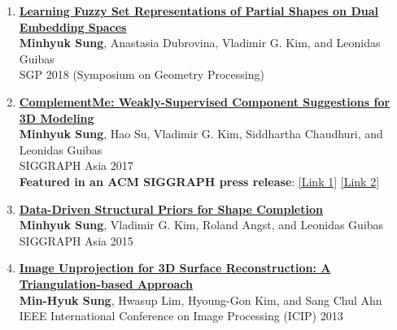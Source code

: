 \documentclass[letterpaper,10pt]{article} %
\newcommand{\blankline}{\quad\pagebreak[2]}
\begin{document}
{\begin{enumerate}
\item \label{sgp18}
\href{https://mhsung.github.io/fuzzy-set-dual}{\textbf{Learning Fuzzy Set Representations of Partial Shapes on Dual Embedding Spaces}}\\
\textbf{Minhyuk Sung}, Anastasia Dubrovina, Vladimir G. Kim, and Leonidas Guibas\\
SGP 2018 (Symposium on Geometry Processing)\\
\blankline

\item \label{siggraphasia17}
\href{https://mhsung.github.io/complement-me.html}{\textbf{ComplementMe: Weakly-Supervised Component Suggestions for 3D Modeling}}\\
\textbf{Minhyuk Sung}, Hao Su, Vladimir G. Kim, Siddhartha Chaudhuri, and Leonidas Guibas\\
SIGGRAPH Asia 2017\\
{\color{linkcolor}
\textbf{Featured in an ACM SIGGRAPH press release}:
\href{https://www.eurekalert.org/pub_releases/2017-11/afcm-sad120417.php}{[Link 1]}
\href{https://scienmag.com/simplifying-assembly-based-design-for-3-d-modeling/}{[Link 2]}
}\\
\blankline

\item \label{siggraphasia15}
\href{https://mhsung.github.io/structure-completion.html}{\textbf{Data-Driven Structural Priors for Shape Completion}}\\
\textbf{Minhyuk Sung}, Vladimir G. Kim, Roland Angst, and Leonidas Guibas\\
SIGGRAPH Asia 2015\\
\blankline

\item \label{icip13}
\href{http://dx.doi.org/10.1109/icip.2013.6738034}{\textbf{Image Unprojection for 3D Surface Reconstruction: A Triangulation-based Approach}}\\
\textbf{Min-Hyuk Sung}, Hwasup Lim, Hyoung-Gon Kim, and Sang Chul Ahn\\
IEEE International Conference on Image Processing (ICIP) 2013\\
\blankline


\end{enumerate}}
\end{document}
